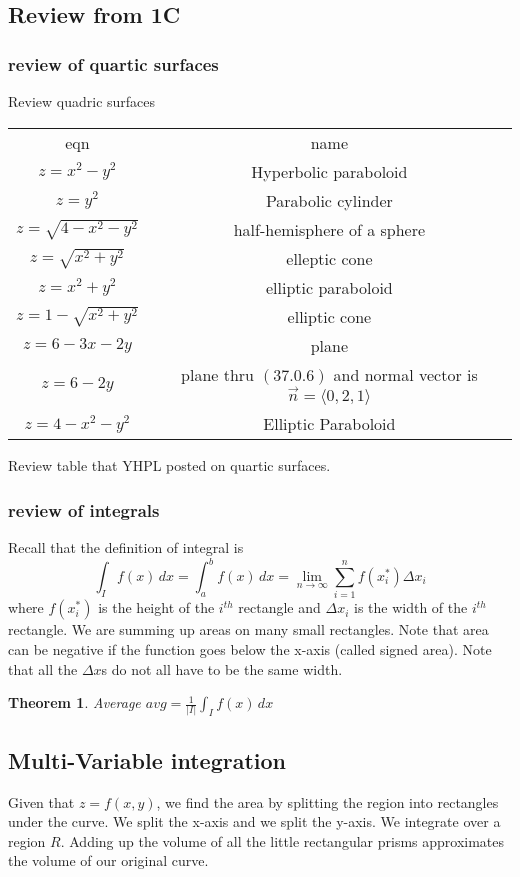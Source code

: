 \documentclass[11pt]{article}
\newtheorem{thm}{Theorem}
\begin{document}
\subsection{Review from 1C}
\subsubsection{review of quartic surfaces}
Review quadric surfaces
\begin{table}[h]
  \centering
  \begin{tabular}{||c c||}
    eqn & name \\
    $z = x^2 - y^ 2$ & Hyperbolic paraboloid \\
    $ z = y^2$ & Parabolic cylinder \\
    $z = \sqrt{4-x^2-y^2}$ & half-hemisphere of a sphere\\
    $z = \sqrt{x^2+y^2}$ & elleptic cone \\
    $ z = x^2 + y^2 $ & elliptic paraboloid \\
    $ z  =1 - \sqrt{x^2 + y^2 } $ & elliptic cone \\
    $ z = 6-3x-2y$ & plane \\
    $ z = 6-2y$ & plane thru $(37.0.6)$ and normal vector is $\vec{n} = \langle 0 ,2 ,1 \rangle$ \\
    $z = 4-x^2-y^2$ &  Elliptic Paraboloid\\
   \end{tabular}
  \end{table}
Review table that YHPL posted on quartic surfaces.
\subsubsection{review of integrals}
Recall that the definition of integral is
\[\int_I f(x) \, dx = \int_a^b f(x) \, dx = \lim_{n \to \infty} \sum_{i=1}^n f(x_i^*) \Delta x_i\]
where $f(x_i^*)$ is the height of the $i^{th}$ rectangle and $\Delta x_i$ is the width of the
$i^{th}$ rectangle. We are summing up areas on many small rectangles. Note that area can be
negative if the function goes below the x-axis (called signed area).
Note that all the $\Delta x$s do not all have to be the same width.

\begin{thm}
  Average
$avg = \frac{1}{|I|} \int_I f(x) \, dx$
\end{thm}
\subsection{Multi-Variable integration}
Given that $z = f(x,y)$, we find the area by splitting the region into rectangles under the
curve. We split the x-axis and we split the y-axis. We integrate over a region $R$.
Adding up the volume of all the little rectangular prisms approximates the volume of
our original curve.
\end{document}
